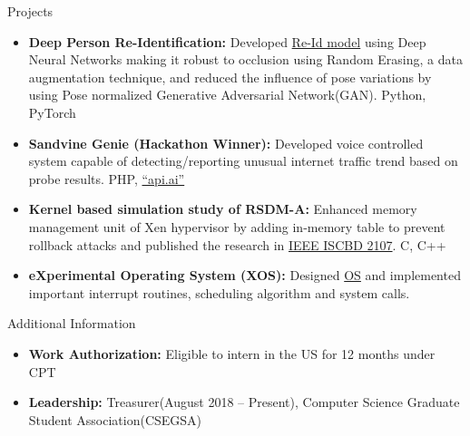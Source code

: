 \documentclass[]{mcdowellcv}
\begin{document}
	\begin{cvsection}{Projects}
		\begin{cvsubsection}{}{}{}
			\begin{itemize}
				\item \textbf{Deep Person Re-Identification:} Developed \href{https://github.com/aditya30394/Person-Re-Identification}{Re-Id model} using Deep Neural Networks making it robust to occlusion using Random Erasing, a data augmentation technique, and reduced the influence of pose variations by using Pose normalized Generative Adversarial Network(GAN).  Python, PyTorch
				\item \textbf{Sandvine Genie (Hackathon Winner):} Developed voice controlled system capable of detecting/reporting unusual internet traffic trend based on probe results.  PHP, \href{https://dialogflow.com/}{``api.ai''}
				\item \textbf{Kernel based simulation study of RSDM-A:} Enhanced memory management unit of Xen hypervisor by adding in-memory table to prevent rollback attacks and  published the research in \href{https://ieeexplore.ieee.org/document/8181523/}{IEEE ISCBD 2107}.  C, C++
				\item \textbf{eXperimental Operating System (XOS): } Designed \href{http://xosnitc.github.io/}{OS} and implemented important interrupt routines, scheduling algorithm and system calls.
			\end{itemize}
		\end{cvsubsection}
	\end{cvsection}
	
	\begin{cvsection}{Additional Information}
		\begin{cvsubsection}{}{}{}	
			\begin{itemize}
				\item \textbf{Work Authorization:} Eligible to intern in the US for 12 months under CPT
				\item \textbf{Leadership:} Treasurer(August 2018 -- Present), Computer Science Graduate Student Association(CSEGSA)
			\end{itemize}
		\end{cvsubsection}
	\end{cvsection}
	
	
	
\end{document}
